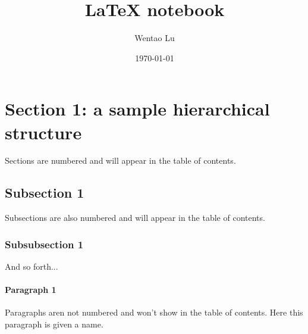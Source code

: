 \documentclass[11pt]{article}  %
\title{LaTeX notebook}   %
\date{\today}            %
\author{Wentao Lu}
\begin{document}


  \maketitle  %
  \newpage

  \doublespacing    %
  \tableofcontents  %
  \newpage          %

  \singlespacing    %



  \section{Section 1: a sample hierarchical structure}
    Sections are numbered and will appear in the table of contents.

    \subsection{Subsection 1}
      Subsections are also numbered and will appear in the table of contents.

      \subsubsection{Subsubsection 1}
        And so forth...

        \paragraph{Paragraph 1}
        Paragraphs aren not numbered and won't show in the table of contents. Here this paragraph is given a name.\\
\end{document}
